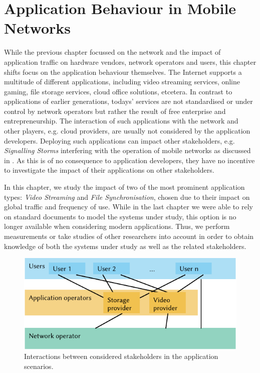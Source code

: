 \chapter{Application Behaviour in Mobile Networks}\label{chap:application}

\newcommand{\download}{Download\xspace}
\newcommand{\live}{Live\xspace}
\newcommand{\serviceprovisioning}{Provisioning\xspace}
\newcommand{\streaming}{Streaming\xspace}

While the previous chapter focussed on the network and the impact of application traffic on hardware vendors, network operators and users, this chapter shifts focus on the application behaviour themselves.
The Internet supports a multitude of different applications, including video streaming services, online gaming, file storage services, cloud office solutions, etcetera.
In contrast to applications of earlier generations, todays' services are not standardised or under control by network operators but rather the result of free enterprise and entrepreneurship.
The interaction of such applications with the network and other players, e.g. cloud providers, are usually not considered by the application developers.
Deploying such applications can impact other stakeholders, e.g. \emph{Signalling Storms} interfering with the operation of mobile networks as discussed in .
As this is of no consequence to application developers, they have no incentive to investigate the impact of their applications on other stakeholders.

In this chapter, we study the impact of two of the most prominent application types: \emph{Video Streaming} and \emph{File Synchronisation}, chosen due to their impact on global traffic and frequency of use.
While in the last chapter we were able to rely on standard documents to model the systems under study, this option is no longer available when considering modern applications.
Thus, we perform measurements or take studies of other researchers into account in order to obtain knowledge of both the systems under study as well as the related stakeholders.

\begin{figure}
  \centering
  \includegraphics{application/figures/stakeholders}
  \caption{Interactions between considered stakeholders in the application scenarios.}
  \label{fig:application:stakeholders}
\end{figure}

